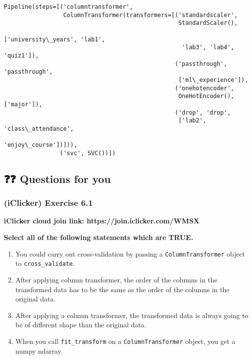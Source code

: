 \documentclass[11pt]{article}
\makeatletter
\providecommand{\tightlist}{%
      \setlength{\itemsep}{0pt}\setlength{\parskip}{0pt}}
\newcommand{\boxspacing}{\kern\kvtcb@left@rule\kern\kvtcb@boxsep}
\newcommand{\prompt}[4]{
        {\ttfamily\llap{{\color{#2}[#3]:\hspace{3pt}#4}}\vspace{-\baselineskip}}
    }
\makeatother
\begin{document}
            \begin{tcolorbox}[breakable, size=fbox, boxrule=.5pt, pad at break*=1mm, opacityfill=0]
\prompt{Out}{outcolor}{19}{\boxspacing}
\begin{Verbatim}[commandchars=\\\{\}]
Pipeline(steps=[('columntransformer',
                 ColumnTransformer(transformers=[('standardscaler',
                                                  StandardScaler(),
                                                  ['university\_years', 'lab1',
                                                   'lab3', 'lab4', 'quiz1']),
                                                 ('passthrough', 'passthrough',
                                                  ['ml\_experience']),
                                                 ('onehotencoder',
                                                  OneHotEncoder(), ['major']),
                                                 ('drop', 'drop',
                                                  ['lab2', 'class\_attendance',
                                                   'enjoy\_course'])])),
                ('svc', SVC())])
\end{Verbatim}
\end{tcolorbox}
        
    

    \subsection{❓❓ Questions for you}\label{questions-for-you}

    \subsubsection{(iClicker) Exercise 6.1}\label{iclicker-exercise-6.1}

\textbf{iClicker cloud join link: https://join.iclicker.com/WMSX}

\textbf{Select all of the following statements which are TRUE.}

\begin{enumerate}
\def\labelenumi{\arabic{enumi}.}
\tightlist
\item
  You could carry out cross-validation by passing a
  \texttt{ColumnTransformer} object to \texttt{cross\_validate}.
\item
  After applying column transformer, the order of the columns in the
  transformed data has to be the same as the order of the columns in the
  original data.
\item
  After applying a column transformer, the transformed data is always
  going to be of different shape than the original data.
\item
  When you call \texttt{fit\_transform} on a \texttt{ColumnTransformer}
  object, you get a numpy ndarray.
\end{enumerate}
\end{document}
